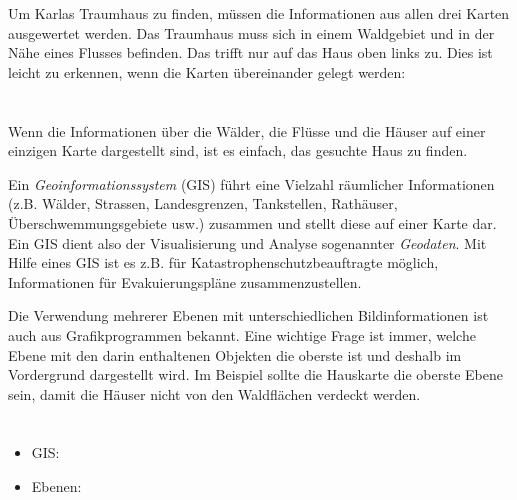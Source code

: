{{{\centering%
\par}

Um Karlas Traumhaus zu finden, müssen die Informationen aus allen drei Karten ausgewertet werden. Das Traumhaus muss sich in einem Waldgebiet und in der Nähe eines Flusses befinden.  Das trifft nur auf das Haus oben links zu. Dies ist leicht zu erkennen, wenn die Karten übereinander gelegt werden:

{\centering%
\par}



\section*{\BrochureItsInformatics}
Wenn die Informationen über die Wälder, die Flüsse und die Häuser auf einer einzigen Karte dargestellt sind, ist es einfach, das gesuchte Haus zu finden.

Ein \emph{Geoinformationssystem} (GIS) führt eine Vielzahl räumlicher Informationen (z.B. Wälder, Strassen, Landesgrenzen, Tankstellen, Rathäuser, Überschwemmungsgebiete usw.) zusammen und stellt diese auf einer Karte dar. Ein GIS dient also der Visualisierung und Analyse sogenannter \emph{Geodaten}. Mit Hilfe eines GIS ist es z.B. für Katastrophenschutzbeauftragte möglich, Informationen für Evakuierungspläne zusammenzustellen.

Die Verwendung mehrerer Ebenen mit unterschiedlichen Bildinformationen ist auch aus Grafikprogrammen bekannt. Eine wichtige Frage ist immer, welche Ebene mit den darin enthaltenen Objekten die oberste ist und deshalb im Vordergrund dargestellt wird. Im Beispiel sollte die Hauskarte die oberste Ebene sein, damit die Häuser nicht von den Waldflächen verdeckt werden.



\section*{\BrochureWebsitesAndKeywords}
{\raggedright
\begin{itemize}
  \item GIS: \href{https://de.wikipedia.org/wiki/Geoinformationssystem}{}
  \item Ebenen: \href{https://de.wikipedia.org/wiki/Ebenentechnik}{}
\end{itemize}


}}}
